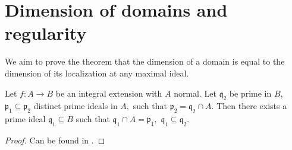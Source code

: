 \section{Dimension of domains and regularity}

We aim to prove the theorem that the dimension of a domain is equal to the dimension of its localization at any maximal ideal.

\begin{prop}
  \label{going-down}
  Let \(f \colon A \to B\) be an integral extension with \(A\) normal. Let \(\mathfrak{q}_2\) be prime in \(B,\) \(\mathfrak{p}_1 \subseteq \mathfrak{p}_2\) distinct prime ideals in \(A,\) such that \(\mathfrak{p}_2 = \mathfrak{q}_2 \cap A.\)
  Then there exists a prime ideal \(\mathfrak{q}_1 \subseteq B\) such that
  \(\mathfrak{q}_1 \cap A = \mathfrak{p}_1,\)
  \(\mathfrak{q}_1 \subseteq \mathfrak{q}_2.\)
\end{prop}
\begin{proof}
  Can be found in \cite{atiyah1994introduction}.
\end{proof}

